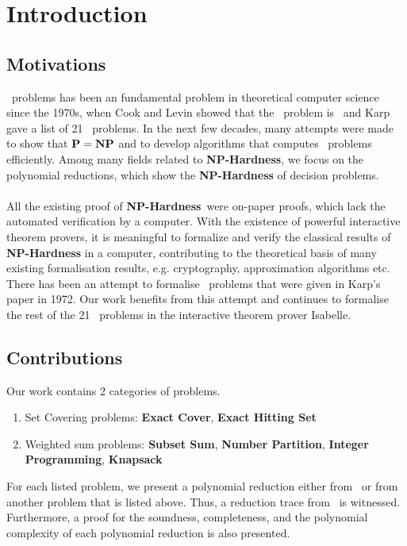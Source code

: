 
\newcommand{\XC}{\textbf{Exact Cover}}
\newcommand{\HS}{\textbf{Exact Hitting Set}}
\newcommand{\SBS}{\textbf{Subset Sum}}
\newcommand{\Part}{\textbf{Number Partition}}
\newcommand{\IP}{\textbf{Integer Programming}}
\newcommand{\KN}{\textbf{Knapsack}}


\chapter{Introduction}\label{chapter:introduction}
\section{Motivations}
\NPH\ problems has been an fundamental problem in theoretical computer science since the 1970s, when Cook and Levin showed that the \SAT\ problem is \NPC\ and Karp gave a list of 21 \NPH\ problems. In the next few decades, many attempts were made to show that $\textbf{P} = \textbf{NP}$ and to develop algorithms that computes \NP\ problems efficiently. Among many fields related to \textbf{NP-Hardness}, we focus on the polynomial reductions, which show the \textbf{NP-Hardness} of decision problems. \\\\
All the existing proof of \textbf{NP-Hardness}\ were on-paper proofs, which lack the automated verification by a computer. With the existence of powerful interactive theorem provers, it is meaningful to formalize and verify the classical results of \textbf{NP-Hardness} in a computer, contributing to the theoretical basis of many existing formalisation results, e.g. cryptography, approximation algorithms etc. There has been an attempt to formalise \NPH\ problems that were given in Karp's paper in 1972. Our work benefits from this attempt and continues to formalise the rest of the 21 \NPH\ problems in the interactive theorem prover Isabelle. 

\section{Contributions}
Our work contains 2 categories of problems. 
\begin{enumerate}
    \item Set Covering problems: \XC, \HS
    \item Weighted sum problems: \SBS, \Part, \IP, \KN
\end{enumerate}
For each listed problem, we present a polynomial reduction either from \SAT\ or from another problem that is listed above. Thus, a reduction trace from \SAT\ is witnessed. Furthermore, a proof for the soundness, completeness, and the polynomial complexity of each polynomial reduction is also presented. 

